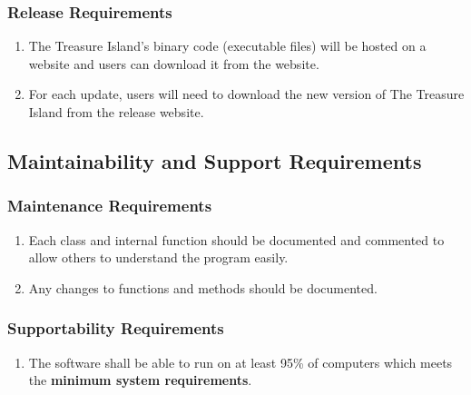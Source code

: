 \documentclass[]{article}
\begin{document}
\subsubsection{Release Requirements}
\label{ssub:release_requirements}

\begin{enumerate}[{OE}1. ]
	\item The Treasure Island's binary code (executable files) will be hosted on a website and users can download it from the website.
	\item For each update, users will need to download the new version of The Treasure Island from the release website.
\end{enumerate}



\subsection{Maintainability and Support Requirements}
\label{sub:maintainability_and_support_requirements}

\subsubsection{Maintenance Requirements}
\label{ssub:maintenance_requirements}

\begin{enumerate}[{MS}1. ]
	\item Each class and internal function should be documented and commented to allow others to understand the program easily.
	\item Any changes to functions and methods should be documented.
\end{enumerate}


\subsubsection{Supportability Requirements}
\label{ssub:supportability_requirements}

\begin{enumerate}[{MS}1. ]
	\item The software shall be able to run on at least 95\% of computers which meets the \textbf{minimum system requirements}.
\end{enumerate}
\end{document}
